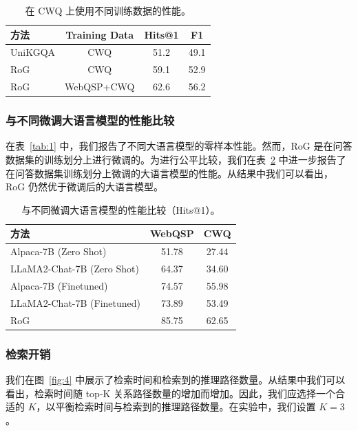 \documentclass[11pt,UTF8,fontset=fandol]{ctexart}
\begin{document}
\begin{table}[H]
\centering
\caption{在 CWQ 上使用不同训练数据的性能。}
\label{tab:15}
\begin{tabular}{lccc}
\toprule
方法 & Training Data & Hits@1 & F1 \\
\midrule
UniKGQA & CWQ          & 51.2 & 49.1 \\
RoG     & CWQ          & 59.1 & 52.9 \\
RoG     & WebQSP+CWQ   & 62.6 & 56.2 \\
\bottomrule
\end{tabular}
\end{table}

\subsubsection{与不同微调大语言模型的性能比较}

在表~\ref{tab:1} 中，我们报告了不同大语言模型的零样本性能。然而，RoG 是在问答数据集的训练划分上进行微调的。为进行公平比较，我们在表~\ref{tab:16} 中进一步报告了在问答数据集训练划分上微调的大语言模型的性能。从结果中我们可以看出，RoG 仍然优于微调后的大语言模型。

\begin{table}[H]
\centering
\caption{与不同微调大语言模型的性能比较（Hits@1）。}
\label{tab:16}
\begin{tabular}{lcc}
\toprule
方法 & WebQSP & CWQ \\
\midrule
Alpaca-7B (Zero Shot)        & 51.78 & 27.44 \\
LLaMA2-Chat-7B (Zero Shot)   & 64.37 & 34.60 \\
Alpaca-7B (Finetuned)        & 74.57 & 55.98 \\
LLaMA2-Chat-7B (Finetuned)   & 73.89 & 53.49 \\
RoG                          & 85.75 & 62.65 \\
\bottomrule
\end{tabular}
\end{table}

\subsubsection{检索开销}

我们在图~\ref{fig:4} 中展示了检索时间和检索到的推理路径数量。从结果中我们可以看出，检索时间随 top-K 关系路径数量的增加而增加。因此，我们应选择一个合适的 $K$，以平衡检索时间与检索到的推理路径数量。在实验中，我们设置 $K = 3$。
\end{document}
